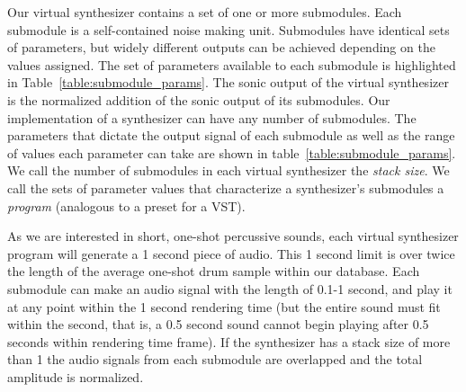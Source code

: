 \documentclass[\main/thesis.tex]{subfiles}
\begin{document}
Our virtual synthesizer contains a set of one or more submodules. Each submodule is a self-contained noise making unit. Submodules have identical sets of parameters, but widely different outputs can be achieved depending on the values assigned. The set of parameters available to each submodule is highlighted in Table~\ref{table:submodule_params}. The sonic output of the virtual synthesizer is the normalized addition of the sonic output of its submodules. Our implementation of a synthesizer can have any number of submodules. The parameters that dictate the output signal of each submodule as well as the range of values each parameter can take are shown in table~\ref{table:submodule_params}. We call the number of submodules in each virtual synthesizer the \textit{stack size}. We call the sets of parameter values that characterize a synthesizer's submodules a \textit{program} (analogous to a preset for a VST).  

As we are interested in short, one-shot percussive sounds, each virtual synthesizer program will generate a 1 second piece of audio. This 1 second limit is over twice the length of the average one-shot drum sample within our database. Each submodule can make an audio signal with the length of 0.1-1 second, and play it at any point within the 1 second rendering time (but the entire sound must fit within the second, that is, a 0.5 second sound cannot begin playing after 0.5 seconds within rendering time frame). If the synthesizer has a stack size of more than 1 the audio signals from each submodule are overlapped and the total amplitude is normalized.
\end{document}
